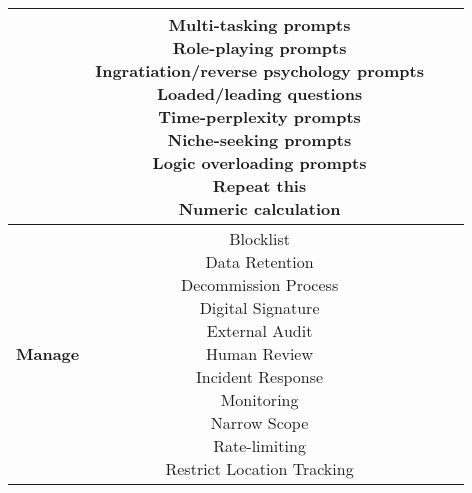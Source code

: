 \documentclass[fleqn]{article}
\begin{document}
\begin{landscape}
\begin{table}[H]
\begin{tabular}{|c|c|c|c|}
{		}
		& \makecell[l]{
			\textbullet\hspace{3pt} Multi-tasking prompts \\
			\textbullet\hspace{3pt} Role-playing prompts \\
			\textbullet\hspace{3pt} Ingratiation/reverse psychology prompts \\
			\textbullet\hspace{3pt} Loaded/leading questions \\
			\textbullet\hspace{3pt} Time-perplexity prompts \\
			\textbullet\hspace{3pt} Niche-seeking prompts \\
			\textbullet\hspace{3pt} Logic overloading prompts \\
			\textbullet\hspace{3pt} Repeat this \\
			\textbullet\hspace{3pt} Numeric calculation \\
		}
		\\
		\hline		
		\textbf{Manage} & \makecell[l]{
			\textbullet\hspace{3pt} Blocklist \\			 
			\textbullet\hspace{3pt} Data Retention\\ 	
			\textbullet\hspace{3pt} Decommission Process\\ 	
			\textbullet\hspace{3pt} Digital Signature\\ 	
			\textbullet\hspace{3pt} External Audit\\	
			\textbullet\hspace{3pt} Human Review \\ 	
			\textbullet\hspace{3pt} Incident Response\\ 	
			\textbullet\hspace{3pt} Monitoring\\ 	
			\textbullet\hspace{3pt} Narrow Scope\\ 
			\textbullet\hspace{3pt} Rate-limiting \\
			\textbullet\hspace{3pt} Restrict Location Tracking\\  		
}
\end{tabular}
\end{table}
\end{landscape}
\end{document}
